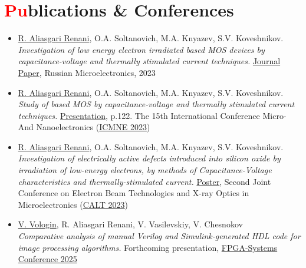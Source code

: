 \documentclass[a4paper, 11pt]{article}
\newcommand{\resumeSubHeadingListStart}{\begin{itemize}[leftmargin=0.0in, label={}]}
\newcommand{\resumeSubHeadingListEnd}{\end{itemize}}
\begin{document}
\section{{\textcolor{red}{Pu}blications} \& Conferences}
\resumeSubHeadingListStart
    \item \underline{R. Aliasgari Renani}, O.A. Soltanovich, M.A. Knyazev, S.V. Koveshnikov. \\ \textit{Investigation of low energy electron irradiated  based MOS devices by capacitance-voltage and thermally stimulated current techniques.} \href{https://doi.org/10.1134/S1063739723600516}{Journal Paper}, Russian Microelectronics, 2023
    \item \underline{R. Aliasgari Renani}, O.A. Soltanovich, M.A. Knyazev, S.V. Koveshnikov. \\ \textit{Study of  based MOS by capacitance-voltage and thermally stimulated current techniques.} \href{https://icmne.ftian.ru/wp-content/uploads/icmne-2023_e-version.pdf}{Presentation}, p.122. The 15th International Conference Micro- And Nanoelectronics (\href{https://icmne.ftian.ru}{ICMNE 2023})
    \item \underline{R. Aliasgari Renani}, O.A. Soltanovich, M.A. Knyazev, S.V. Koveshnikov. \\ \textit{Investigation of electrically active defects introduced into silicon oxide by irradiation of low-energy electrons, by methods of Capacitance-Voltage characteristics and thermally-stimulated current.} \href{https://cebt23.iptm.ru/download/numbered/91.pdf}{Poster}, Second Joint Conference on Electron Beam Technologies and X-ray Optics in Microelectronics (\href{https://cebt23.iptm.ru}{CALT 2023})
    \item \underline{V. Vologin}, R. Aliasgari Renani, V. Vasilevskiy, V. Chesnokov \\ \textit{Comparative analysis of manual Verilog and Simulink-generated HDL code for image processing algorithms.} Forthcoming presentation, \href{https://meetups.yadro.com/fpga-msk-1125/}{FPGA-Systems Conference 2025}
    
\resumeSubHeadingListEnd
\vspace{-20pt}
\end{document}
